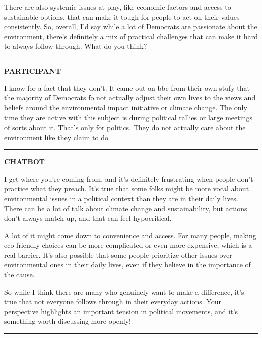 \documentclass[
  11pt,
  oneside]{article}
\begin{document}
There are also systemic issues at play, like economic factors and access
to sustainable options, that can make it tough for people to act on
their values consistently. So, overall, I'd say while a lot of Democrats
are passionate about the environment, there's definitely a mix of
practical challenges that can make it hard to always follow through.
What do you think?

\begin{center}\rule{0.5\linewidth}{0.5pt}\end{center}

\textbf{PARTICIPANT}

I know for a fact that they don't. It came out on bbc from their own
stufy that the majority of Democrats fo not actually adjust their own
lives to the views and beliefs around the environmental impact
initiative or climate change. The only time they are active with this
subject is during political rallies or large meetings of sorts about it.
That's only for politics. They do not actually care about the
environment like they claim to do

\begin{center}\rule{0.5\linewidth}{0.5pt}\end{center}

\textbf{CHATBOT}

I get where you're coming from, and it's definitely frustrating when
people don't practice what they preach. It's true that some folks might
be more vocal about environmental issues in a political context than
they are in their daily lives. There can be a lot of talk about climate
change and sustainability, but actions don't always match up, and that
can feel hypocritical.

A lot of it might come down to convenience and access. For many people,
making eco-friendly choices can be more complicated or even more
expensive, which is a real barrier. It's also possible that some people
prioritize other issues over environmental ones in their daily lives,
even if they believe in the importance of the cause.

So while I think there are many who genuinely want to make a difference,
it's true that not everyone follows through in their everyday actions.
Your perspective highlights an important tension in political movements,
and it's something worth discussing more openly!

\begin{center}\rule{0.5\linewidth}{0.5pt}\end{center}
\end{document}

